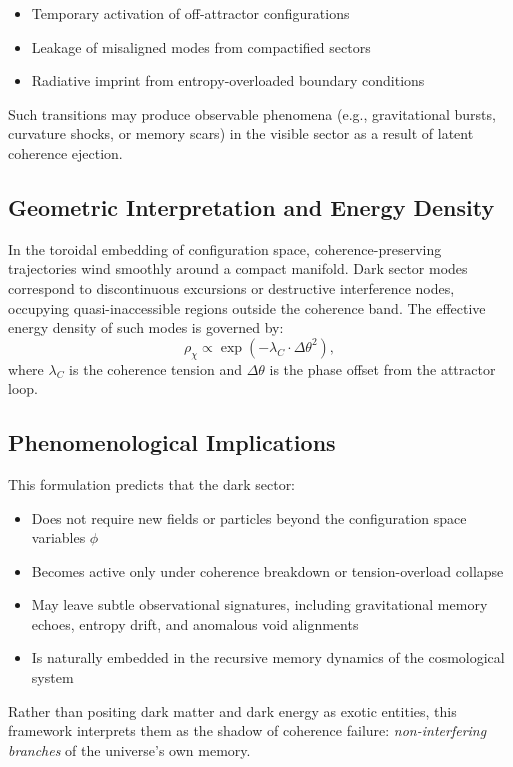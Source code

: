 \begin{itemize}
  \item Temporary activation of off-attractor configurations
  \item Leakage of misaligned modes from compactified sectors
  \item Radiative imprint from entropy-overloaded boundary conditions
\end{itemize}

Such transitions may produce observable phenomena (e.g., gravitational bursts, curvature shocks, or memory scars) in the visible sector as a result of latent coherence ejection.

\subsection*{Geometric Interpretation and Energy Density}

In the toroidal embedding of configuration space, coherence-preserving trajectories wind smoothly around a compact manifold. Dark sector modes correspond to discontinuous excursions or destructive interference nodes, occupying quasi-inaccessible regions outside the coherence band. The effective energy density of such modes is governed by:
\[
\rho_{\chi} \propto \exp\left( -\lambda_C \cdot \Delta \theta^2 \right),
\]
where \( \lambda_C \) is the coherence tension and \( \Delta \theta \) is the phase offset from the attractor loop.

\subsection*{Phenomenological Implications}

This formulation predicts that the dark sector:

\begin{itemize}
  \item Does not require new fields or particles beyond the configuration space variables \( \phi \)
  \item Becomes active only under coherence breakdown or tension-overload collapse
  \item May leave subtle observational signatures, including gravitational memory echoes, entropy drift, and anomalous void alignments
  \item Is naturally embedded in the recursive memory dynamics of the cosmological system
\end{itemize}

Rather than positing dark matter and dark energy as exotic entities, this framework interprets them as the shadow of coherence failure: \textit{non-interfering branches} of the universe’s own memory.
